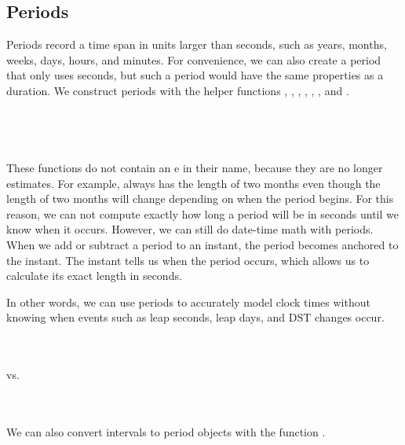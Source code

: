 \documentclass[article]{jss}
\begin{document}
\subsection{Periods}
\label{sec:periods}

Periods record a time span in units larger than seconds, such as years, months, weeks, days, hours, and minutes. For convenience, we can also create a period that only uses seconds, but such a period would have the same properties as a duration. We construct periods with the helper functions , , , , , , and  .\\

\\
\\

\\
\\

These functions do not contain an e in their name, because they are no longer estimates. For example,  always has the length of two months even though the length of two months will change depending on when the period begins. For this reason, we can not compute exactly how long a period will be in seconds until we know when it occurs. However, we can still do date-time math with periods. When we add or subtract a period to an instant, the period becomes anchored to the instant. The instant tells us when the period occurs, which allows us to calculate its exact length in seconds. 

In other words, we can use periods to accurately model clock times without knowing when events such as leap seconds, leap days, and DST changes occur.

\\
\\

vs.

\\
\\

We can also convert intervals to period objects with the function .\\

\\
\\
\end{document}
